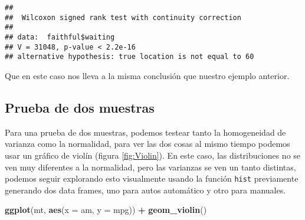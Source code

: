 \documentclass[]{book}
\newenvironment{Shaded}{\begin{snugshade}}{\end{snugshade}}
\newcommand{\KeywordTok}[1]{\textcolor[rgb]{0.13,0.29,0.53}{\textbf{#1}}}
\newcommand{\DataTypeTok}[1]{\textcolor[rgb]{0.13,0.29,0.53}{#1}}
\newcommand{\DecValTok}[1]{\textcolor[rgb]{0.00,0.00,0.81}{#1}}
\newcommand{\StringTok}[1]{\textcolor[rgb]{0.31,0.60,0.02}{#1}}
\newcommand{\OperatorTok}[1]{\textcolor[rgb]{0.81,0.36,0.00}{\textbf{#1}}}
\newcommand{\NormalTok}[1]{#1}
\begin{document}
\begin{Shaded}
\end{Shaded}

\begin{verbatim}
## 
##  Wilcoxon signed rank test with continuity correction
## 
## data:  faithful$waiting
## V = 31048, p-value < 2.2e-16
## alternative hypothesis: true location is not equal to 60
\end{verbatim}

Que en este caso nos lleva a la misma conclusión que nuestro ejemplo
anterior.

\subsection{Prueba de dos muestras}\label{prueba-de-dos-muestras}

Para una prueba de dos muestras, podemos testear tanto la homogeneidad
de varianza como la normalidad, para ver las dos cosas al mismo tiempo
podemos usar un gráfico de violín (figura \ref{fig:Violin}). En este
caso, las distribuciones no se ven muy diferentes a la normalidad, pero
las varianzas se ven un tanto distintas, podemos seguir explorando esto
visualmente usando la función \texttt{hist} previamente generando dos
data frames, uno para autos automático y otro para manuales.

\begin{Shaded}
\end{Shaded}

\begin{Shaded}
\begin{Highlighting}[]
\KeywordTok{ggplot}\NormalTok{(mt, }\KeywordTok{aes}\NormalTok{(}\DataTypeTok{x =}\NormalTok{ am, }\DataTypeTok{y =}\NormalTok{ mpg)) }\OperatorTok{+}\StringTok{ }\KeywordTok{geom_violin}\NormalTok{()}
\end{Highlighting}
\end{Shaded}
\end{document}
